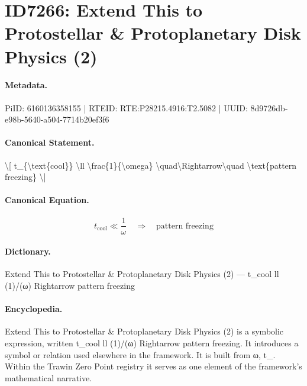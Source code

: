 \section*{ID7266: Extend This to Protostellar \& Protoplanetary Disk Physics (2)}
\paragraph{Metadata.}
PiID: 6160136358155 | RTEID: RTE:P28215.4916:T2.5082 | UUID: 8d9726db-e98b-5640-a504-7714b20ef3f6

\paragraph{Canonical Statement.}
\textbackslash{}[ t\_\{\textbackslash{}text\{cool\}\} \textbackslash{}ll \textbackslash{}frac\{1\}\{\textbackslash{}omega\} \textbackslash{}quad\textbackslash{}Rightarrow\textbackslash{}quad \textbackslash{}text\{pattern freezing\} \textbackslash{}]

\paragraph{Canonical Equation.}
\[
t_{\text{cool}} \ll \frac{1}{\omega} \quad\Rightarrow\quad \text{pattern freezing}
\]

\paragraph{Dictionary.}
Extend This to Protostellar \& Protoplanetary Disk Physics (2) — t\_cool ll (1)/(ω) Rightarrow pattern freezing

\paragraph{Encyclopedia.}
Extend This to Protostellar \& Protoplanetary Disk Physics (2) is a symbolic expression, written t\_cool ll (1)/(ω) Rightarrow pattern freezing. It introduces a symbol or relation used elsewhere in the framework. It is built from ω, t\_. Within the Trawin Zero Point registry it serves as one element of the framework's mathematical narrative.
